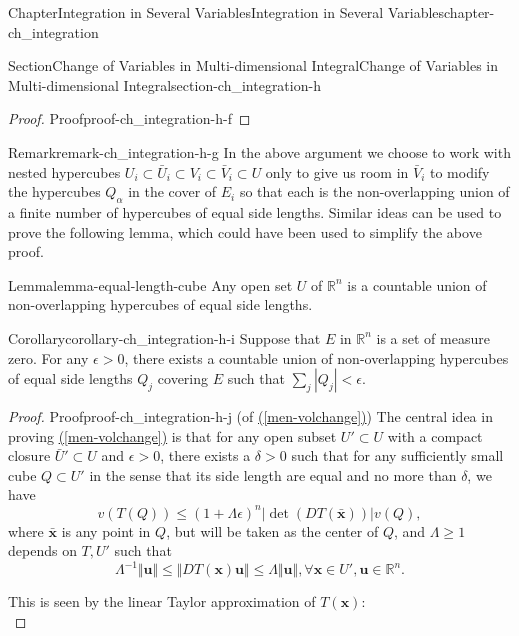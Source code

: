 \documentclass[oneside,10pt,]{book}
\newcommand{\xreffont}{\relax}
\numberwithin{equation}{section}
\newcommand{\bbR}{\mathbb{R}}
\newcommand{\lt}{<}
\begin{document}
\begin{chapterptx}{Chapter}{Integration in Several Variables}{}{Integration in Several Variables}{}{}{chapter-ch_integration}
\begin{sectionptx}{Section}{Change of Variables in Multi-dimensional Integral}{}{Change of Variables in Multi-dimensional Integral}{}{}{section-ch_integration-h}
\begin{proof}{Proof}{}{proof-ch_integration-h-f}
\end{proof}
\begin{remark}{Remark}{}{remark-ch_integration-h-g}%
In the above argument we choose to work with nested hypercubes \(U_{i}\subset \bar U_{i}\subset V_{i}\subset \bar V_{i}\subset U\) only to give us room in \(\bar V_{i}\) to modify the hypercubes \(Q_{\alpha}\) in the cover of \(E_{i}\) so that each is the non-overlapping union of a finite number of hypercubes of equal side lengths. Similar ideas can be used to prove the following lemma, which could have been used to simplify the above proof.%
\end{remark}
\begin{lemma}{Lemma}{}{}{lemma-equal-length-cube}%
Any open set \(U\) of \(\bbR^{n}\) is a countable union of non-overlapping  hypercubes of equal side lengths.\end{lemma}
\begin{corollary}{Corollary}{}{}{corollary-ch_integration-h-i}%
Suppose that   \(E\) in \(\bbR^{n}\) is a set of measure zero. For any \(\epsilon >0\), there exists a countable union of non-overlapping  hypercubes of equal side lengths \(Q_{j}\) covering \(E\) such that \(\sum_{j} |Q_{j}| \lt \epsilon\).\end{corollary}
\begin{proof}{Proof}{}{proof-ch_integration-h-j}
(of \hyperref[men-volchange]{({\xreffont\ref{men-volchange}})}) The central idea in proving \hyperref[men-volchange]{({\xreffont\ref{men-volchange}})} is that for any open subset \(U'\subset U\) with a compact closure \(\bar U' \subset U\) and \(\epsilon>0\), there exists a \(\delta >0\) such that for any sufficiently small cube \(Q\subset U'\) in the sense that its side length are equal and no more than \(\delta\), we have%
\begin{equation*}
v(T(Q))\le (1 +\Lambda \epsilon)^{n} \left|\det \left(D T(\bar {\mathbf x})\right)\right| v(Q),
\end{equation*}
where \(\bar {\mathbf x}\) is any point in \(Q\), but will be taken as the center of \(Q\), and  \(\Lambda \ge 1\) depends on \(T, U'\) such that%
\begin{equation*}
\Lambda^{-1}\Vert \mathbf u \Vert \le \Vert DT({\mathbf x}) \mathbf u \Vert \le \Lambda \Vert \mathbf u\Vert,
\forall {\mathbf x} \in U', \mathbf u \in \mathbb R^{n}.
\end{equation*}
%
\par
This is seen by the linear Taylor approximation of \(T({\mathbf x})\):%
\begin{equation*}

\end{equation*}
\end{proof}
\end{sectionptx}
\end{chapterptx}
\end{document}
